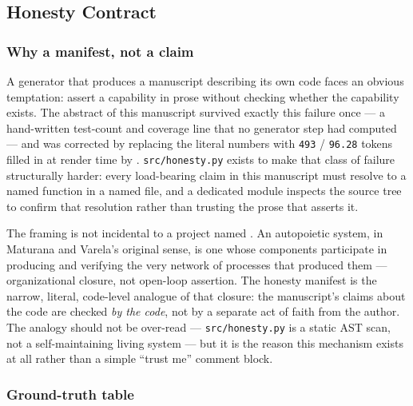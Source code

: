 \documentclass[
]{article}
\begin{document}
\newpage

\subsection{Honesty Contract}\label{honesty-contract}

\subsubsection{Why a manifest, not a
claim}\label{why-a-manifest-not-a-claim}

A generator that produces a manuscript describing its own code faces an
obvious temptation: assert a capability in prose without checking
whether the capability exists. The abstract of this manuscript survived
exactly this failure once --- a hand-written test-count and coverage
line that no generator step had computed --- and was corrected by
replacing the literal numbers with \texttt{493} / \texttt{96.28} tokens
filled in at render time by
. \texttt{src/honesty.py}
exists to make that class of failure structurally harder: every
load-bearing claim in this manuscript must resolve to a named function
in a named file, and a dedicated module inspects the source tree to
confirm that resolution rather than trusting the prose that asserts it.

The framing is not incidental to a project named
. An autopoietic system, in Maturana and
Varela's original sense, is one whose components participate in
producing and verifying the very network of processes that produced them
\citep{maturana_varela_1980} --- organizational closure, not open-loop
assertion. The honesty manifest is the narrow, literal, code-level
analogue of that closure: the manuscript's claims about the code are
checked \emph{by the code}, not by a separate act of faith from the
author. The analogy should not be over-read --- \texttt{src/honesty.py}
is a static AST scan, not a self-maintaining living system --- but it is
the reason this mechanism exists at all rather than a simple ``trust
me'' comment block.

\subsubsection{Ground-truth table}\label{ground-truth-table}
\end{document}
